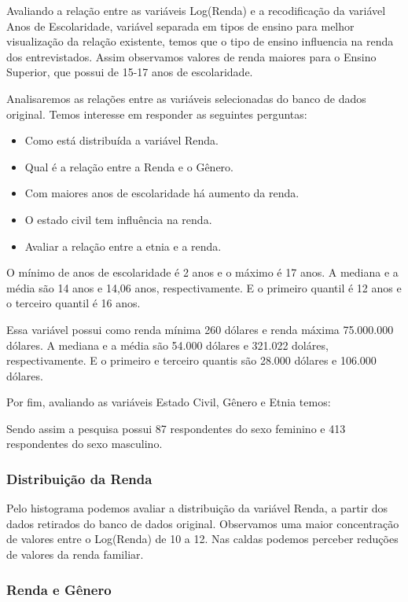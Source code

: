 \documentclass[]{article}
\begin{document}
Avaliando a relação entre as variáveis Log(Renda) e a recodificação da
variável Anos de Escolaridade, variável separada em tipos de ensino para
melhor visualização da relação existente, temos que o tipo de ensino
influencia na renda dos entrevistados. Assim observamos valores de renda
maiores para o Ensino Superior, que possui de 15-17 anos de
escolaridade.

Analisaremos as relações entre as variáveis selecionadas do banco de
dados original. Temos interesse em responder as seguintes perguntas:

\begin{itemize}
\item
  Como está distribuída a variável Renda.
\item
  Qual é a relação entre a Renda e o Gênero.
\item
  Com maiores anos de escolaridade há aumento da renda.
\item
  O estado civil tem influência na renda.
\item
  Avaliar a relação entre a etnia e a renda.
\end{itemize}

O mínimo de anos de escolaridade é 2 anos e o máximo é 17 anos. A
mediana e a média são 14 anos e 14,06 anos, respectivamente. E o
primeiro quantil é 12 anos e o terceiro quantil é 16 anos.

Essa variável possui como renda mínima 260 dólares e renda máxima
75.000.000 dólares. A mediana e a média são 54.000 dólares e 321.022
doláres, respectivamente. E o primeiro e terceiro quantis são 28.000
dólares e 106.000 dólares.

Por fim, avaliando as variáveis Estado Civil, Gênero e Etnia temos:

Sendo assim a pesquisa possui 87 respondentes do sexo feminino e 413
respondentes do sexo masculino.

\subsubsection{Distribuição da Renda}\label{distribuicao-da-renda}

Pelo histograma podemos avaliar a distribuição da variável Renda, a
partir dos dados retirados do banco de dados original. Observamos uma
maior concentração de valores entre o Log(Renda) de 10 a 12. Nas caldas
podemos perceber reduções de valores da renda familiar.

\subsubsection{Renda e Gênero}\label{renda-e-genero}
\end{document}
